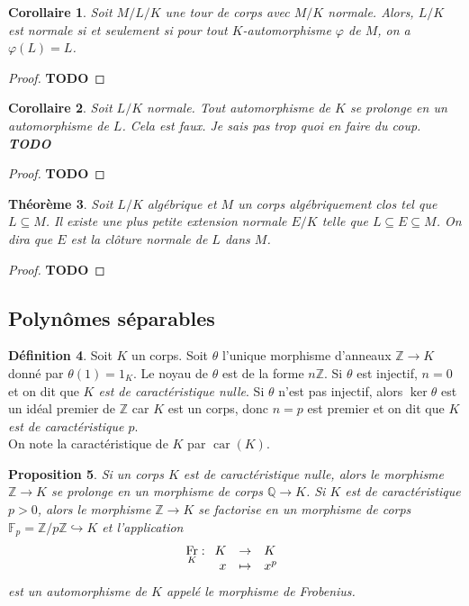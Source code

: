 \documentclass{article}
\newcommand{\Z}{\mathbb{Z}}
\newcommand{\Q}{\mathbb{Q}}
\newcommand{\F}{\mathbb{F}}
\DeclareMathOperator{\car}{car}
\DeclareMathOperator{\Fr}{Fr}
\newcommand{\todo}{\textbf{TODO}}
\newcommand{\applic}[4]{\begin{array}[t]{rcl}
#1 & \to & #2 \\
#3 & \mapsto & #4
\end{array}}
\theoremstyle{plain}
\newtheorem{theorem}{Théorème}[subsection]
\newtheorem{proposition}[theorem]{Proposition}
\newtheorem{corollary}[theorem]{Corollaire}
\theoremstyle{definition}
\newtheorem{definition}[theorem]{Définition}
\theoremstyle{remark}
\begin{document}
\begin{corollary}
    Soit $M/L/K$ une tour de corps avec $M/K$ normale. Alors, $L/K$ est normale si et seulement si pour tout $K$-automorphisme $\varphi$ de $M$, on a $\varphi(L) = L$.
\end{corollary}

\begin{proof}
    \todo
\end{proof}

\begin{corollary}
    Soit $L/K$ normale. Tout automorphisme de $K$ se prolonge en un automorphisme de $L$. Cela est faux. Je sais pas trop quoi en faire du coup. \todo
\end{corollary}

\begin{proof}
    \todo
\end{proof}

\begin{theorem}
    Soit $L/K$ algébrique et $M$ un corps algébriquement clos tel que $L \subseteq M$. Il existe une plus petite extension normale $E/K$ telle que $L \subseteq E \subseteq M$. On dira que $E$ est la \emph{clôture normale de $L$ dans $M$}.
\end{theorem}

\begin{proof}
    \todo
\end{proof}

\subsection{Polynômes séparables}

\begin{definition}
    Soit $K$ un corps. Soit $\theta$ l'unique morphisme d'anneaux $\Z \to K$ donné par $\theta(1) = 1_K$. Le noyau de $\theta$ est de la forme $n\Z$. Si $\theta$ est injectif, $n = 0$ et on dit que \emph{$K$ est de caractéristique nulle}. Si $\theta$ n'est pas injectif, alors $\ker \theta$ est un idéal premier de $\Z$ car $K$ est un corps, donc $n = p$ est premier et on dit que \emph{$K$ est de caractéristique $p$}. \\
    On note la caractéristique de $K$ par $\car(K)$.
\end{definition}

\begin{proposition}
    Si un corps $K$ est de caractéristique nulle, alors le morphisme $\Z \to K$ se prolonge en un morphisme de corps $\Q \to K$. Si $K$ est de caractéristique $p > 0$, alors le morphisme $\Z \to K$ se factorise en un morphisme de corps $\F_p = \Z/p\Z \hookrightarrow K$ et l'application
    \[\Fr_K : \applic{K}{K}{x}{x^p}\]
    est un automorphisme de $K$ appelé \emph{le morphisme de Frobenius}.
\end{proposition}
\end{document}
